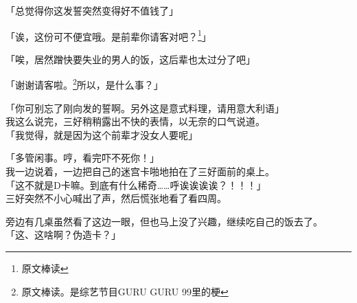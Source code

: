 「总觉得你这发誓突然变得好不值钱了」

「诶，这份可不便宜哦。是前辈你请客对吧？\footnote{原文棒读}」

「唉，居然蹭快要失业的男人的饭，这后辈也太过分了吧」

「谢谢请客啦。\footnote{原文棒读。是综艺节目GURU GURU 99里的梗}所以，是什么事？」

「你可别忘了刚向发的誓啊。另外这是意式料理，请用意大利语」\\

我这么说完，三好稍稍露出不快的表情，以无奈的口气说道。\\

「我觉得，就是因为这个前辈才没女人要呢」

「多管闲事。哼，看完吓不死你！」\\

我一边说着，一边把自己的迷宫卡啪地拍在了三好面前的桌上。\\

「这不就是D卡嘛。到底有什么稀奇……呼诶诶诶诶？！！！」\\

三好突然不小心喊出了声，然后慌张地看了看四周。

旁边有几桌虽然看了这边一眼，但也马上没了兴趣，继续吃自己的饭去了。\\

「这、这啥啊？伪造卡？」\\


